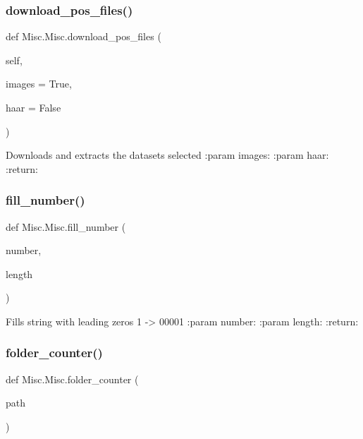 \subsubsection{\texorpdfstring{download\+\_\+pos\+\_\+files()}{download\_pos\_files()}}
{\footnotesize\ttfamily def Misc.\+Misc.\+download\+\_\+pos\+\_\+files (\begin{DoxyParamCaption}\item[{}]{self,  }\item[{}]{images = {\ttfamily True},  }\item[{}]{haar = {\ttfamily False} }\end{DoxyParamCaption})}

\begin{DoxyVerb}Downloads and extracts the datasets selected
:param images:
:param haar:
:return:
\end{DoxyVerb}
 \mbox{\label{class_misc_1_1_misc_a58fba0bed4c5f2ff76cdf83e20670fb4}} 
\subsubsection{\texorpdfstring{fill\+\_\+number()}{fill\_number()}}
{\footnotesize\ttfamily def Misc.\+Misc.\+fill\+\_\+number (\begin{DoxyParamCaption}\item[{}]{number,  }\item[{}]{length }\end{DoxyParamCaption})\hspace{0.3cm}{\ttfamily [static]}}

\begin{DoxyVerb}Fills string with leading zeros 1 -> 00001
:param number:
:param length:
:return:
\end{DoxyVerb}
 \mbox{\label{class_misc_1_1_misc_a8d30d14e25c28f7f8ac3798e501d4aaa}} 
\subsubsection{\texorpdfstring{folder\+\_\+counter()}{folder\_counter()}}
{\footnotesize\ttfamily def Misc.\+Misc.\+folder\+\_\+counter (\begin{DoxyParamCaption}\item[{}]{path }\end{DoxyParamCaption})\hspace{0.3cm}{\ttfamily [static]}}

